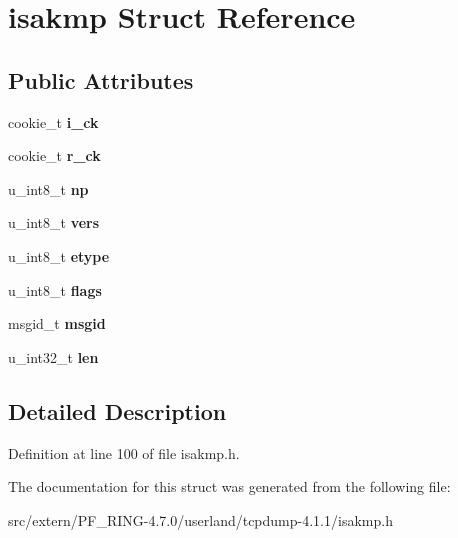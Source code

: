 \hypertarget{structisakmp}{
\section{isakmp Struct Reference}
\label{structisakmp}
}
\subsection*{Public Attributes}
\begin{DoxyCompactItemize}
\item 
\hypertarget{structisakmp_a668f4316850dfeda1d23d320fb0654c8}{
cookie\_\-t {\bfseries i\_\-ck}}
\label{structisakmp_a668f4316850dfeda1d23d320fb0654c8}

\item 
\hypertarget{structisakmp_a4fc099536cbeaa25683553e1ca296229}{
cookie\_\-t {\bfseries r\_\-ck}}
\label{structisakmp_a4fc099536cbeaa25683553e1ca296229}

\item 
\hypertarget{structisakmp_ab3efe90f836f14b03fe946e8370673ac}{
u\_\-int8\_\-t {\bfseries np}}
\label{structisakmp_ab3efe90f836f14b03fe946e8370673ac}

\item 
\hypertarget{structisakmp_a680ba1f8742a075c4f11dd35d81f77a7}{
u\_\-int8\_\-t {\bfseries vers}}
\label{structisakmp_a680ba1f8742a075c4f11dd35d81f77a7}

\item 
\hypertarget{structisakmp_a0ca3183a0038e10a8a16da415b36b547}{
u\_\-int8\_\-t {\bfseries etype}}
\label{structisakmp_a0ca3183a0038e10a8a16da415b36b547}

\item 
\hypertarget{structisakmp_a901d8d0e682b5f653e8e68f3df7423a7}{
u\_\-int8\_\-t {\bfseries flags}}
\label{structisakmp_a901d8d0e682b5f653e8e68f3df7423a7}

\item 
\hypertarget{structisakmp_a979a96d54ca33110507c02eb1eaca87c}{
msgid\_\-t {\bfseries msgid}}
\label{structisakmp_a979a96d54ca33110507c02eb1eaca87c}

\item 
\hypertarget{structisakmp_a4261ee523179bdf6c79ca3614edce609}{
u\_\-int32\_\-t {\bfseries len}}
\label{structisakmp_a4261ee523179bdf6c79ca3614edce609}

\end{DoxyCompactItemize}


\subsection{Detailed Description}


Definition at line 100 of file isakmp.h.



The documentation for this struct was generated from the following file:\begin{DoxyCompactItemize}
\item 
src/extern/PF\_\-RING-\/4.7.0/userland/tcpdump-\/4.1.1/isakmp.h\end{DoxyCompactItemize}

